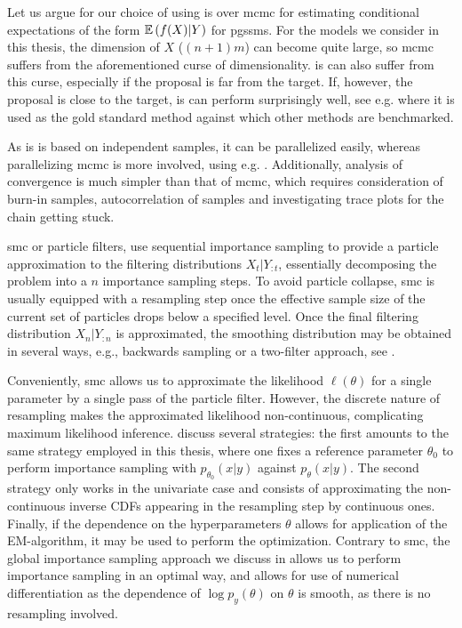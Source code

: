 Let us argue for our choice of using \gls{is} over \gls{mcmc} for estimating conditional expectations of the form $\mathbb E \left( f(X)|Y \right)$ for \glspl{pgssm}. For the models we consider in this thesis, the dimension of $X$ ($(n+1)m$) can become quite large, so \gls{mcmc} suffers from the aforementioned curse of dimensionality. \gls{is} can also suffer from this curse, especially if the proposal is far from the target. If, however, the proposal is close to the target, \gls{is} can perform surprisingly well, see e.g. \citep{Chopin2017Leave} where it is used as the gold standard method against which other methods are benchmarked. 

As \gls{is} is based on independent samples, it can be parallelized easily, whereas parallelizing \gls{mcmc} is more involved, using e.g. \citep{Neiswanger2014Asymptotically}. Additionally, analysis of convergence is much simpler than that of \gls{mcmc}, which requires consideration of burn-in samples, autocorrelation of samples and investigating trace plots for the chain getting stuck. 

\gls{smc} \citep{Chopin2020Introduction} or particle filters, use sequential importance sampling to provide a particle approximation to the filtering distributions $X_{t} | Y_{:t}$, essentially decomposing the problem into a $n$ importance sampling steps. 
To avoid particle collapse, \gls{smc} is usually equipped with a resampling step once the effective sample size of the current set of particles drops below a specified level. Once the final filtering distribution $X_{n}|Y_{:n}$ is approximated, the smoothing distribution may be obtained in several ways, e.g., backwards sampling or a two-filter approach, see \citep[Chapter 12]{Chopin2020Introduction}.

Conveniently, \gls{smc} allows us to approximate the likelihood $\ell(\theta)$ for a single parameter by a single pass of the particle filter. However, the discrete nature of resampling makes the approximated likelihood non-continuous, complicating maximum likelihood inference. \citet[Chapter 14]{Chopin2020Introduction} discuss several strategies: the first amounts to the same strategy employed in this thesis, where one fixes a reference parameter $\theta_{0}$ to perform importance sampling with $p_{\theta_{0}}(x|y)$ against $p_{\theta}(x|y)$. The second strategy only works in the univariate case and consists of approximating the non-continuous inverse CDFs appearing in the resampling step by continuous ones. Finally, if the dependence on the hyperparameters $\theta$ allows for application of the EM-algorithm, it may be used to perform the optimization.
Contrary to \gls{smc}, the global importance sampling approach we discuss in  allows us to perform importance sampling in an optimal way, and allows for use of numerical differentiation as the dependence of $\log p_{y} (\theta)$ on $\theta$ is smooth, as there is no resampling involved.

